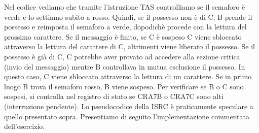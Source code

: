 Nel codice vediamo che tramite l'istruzione TAS controlliamo se il semaforo è verde e lo settiamo subito a rosso. Quindi, se il possesso non è di C, B prende il possesso e reimposta il semaforo a verde, dopodichè procede con la lettura del prossimo carattere. Se il messaggio è finito, se C è sospeso C viene sbloccato attraverso la lettura del carattere di C, altrimenti viene liberato il possesso. Se il possesso è già di C, C potrebbe aver provato ad accedere alla sezione critica (invio del messaggio) mentre B controllava in mutua esclusione il possesso. In questo caso, C viene sbloccato attraverso la lettura di un carattere. Se in primo luogo B trova il semaforo rosso, B viene sospeso.
Per verificare se B o C sono sospesi, si controlla nel registro di stato se CRA7B o CRA7C sono alti (interruzione pendente). 
Lo pseudocodice della ISRC è praticamente speculare a quello presentato sopra. Presentiamo di seguito l'implementazione commentata dell'esercizio.

